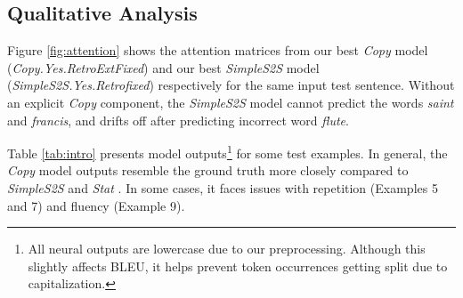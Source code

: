 \subsection{Qualitative Analysis}
Figure \ref{fig:attention} shows the attention matrices from our best \textit{Copy} model (\emph{Copy.Yes.RetroExtFixed}) and our best \textit{SimpleS2S} model (\emph{SimpleS2S.Yes.Retrofixed}) respectively for the same input test sentence. Without an explicit \textit{Copy} component, the \textit{SimpleS2S} model cannot predict the words \textit{saint} and \textit{francis}, and drifts off after predicting incorrect word \textit{flute}.

Table \ref{tab:intro} presents model outputs\footnote{All neural outputs are lowercase due to our preprocessing. Although this slightly affects BLEU, it helps prevent token occurrences getting split due to capitalization.} for some test examples. In general, the \textit{Copy} model outputs resemble the ground truth more closely compared to \textit{SimpleS2S} and \textit{Stat} . In some cases, it faces issues with repetition (Examples 5 and 7) and fluency (Example 9).
